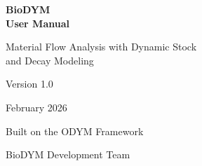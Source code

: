 \documentclass[11pt,a4paper,twoside]{report}
\begin{document}
\begin{titlepage}
\centering
\vspace*{3cm}
{\Huge\bfseries\color{biodym-blue} BioDYM\\[0.3cm] User Manual\par}
\vspace{1cm}
{\Large Material Flow Analysis with Dynamic Stock\\and Decay Modeling\par}
\vspace{2cm}
{\large Version 1.0\par}
\vspace{0.5cm}
{\large February 2026\par}
\vspace{3cm}
{\normalsize Built on the ODYM Framework\par}
\vfill
{\small BioDYM Development Team}
\end{titlepage}

\tableofcontents
\clearpage













\appendix



\end{document}
